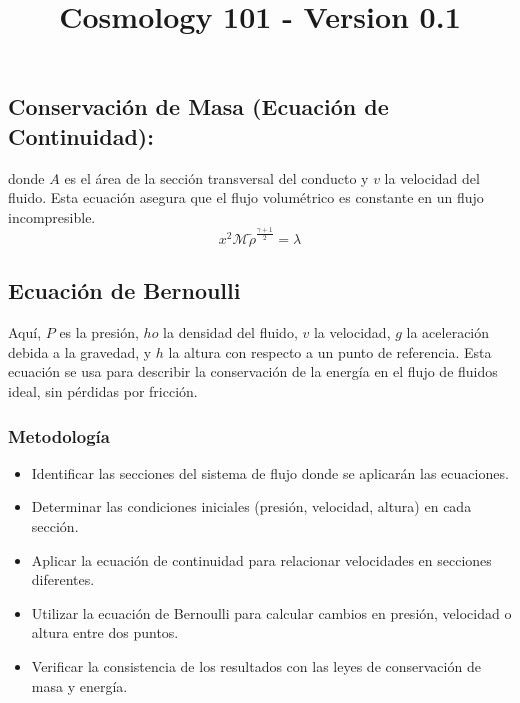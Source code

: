 \documentclass{article}\usepackage{graphicx} \usepackage{amsmath} \usepackage{colortbl}\title{Cosmology 101 - Version 0.1}
\begin{document}
\subsection{Conservación de Masa (Ecuación de Continuidad):}
donde $A$ es el área de la sección transversal del conducto y $v$ la velocidad del fluido. Esta ecuación asegura que el flujo volumétrico es constante en un flujo incompresible.\begin{equation}x^2 \mathcal{M} \tilde{\rho }^{\frac{\gamma +1}{2}}=\lambda\label{ber1}\end{equation}\subsection{Ecuación de Bernoulli}
Aquí, $P$ es la presión, $
ho$ la densidad del fluido, $v$ la velocidad, $g$ la aceleración debida a la gravedad, y $h$ la altura con respecto a un punto de referencia. Esta ecuación se usa para describir la conservación de la energía en el flujo de fluidos ideal, sin pérdidas por fricción.
\subsubsection{Metodología}
\begin{itemize}
\item Identificar las secciones del sistema de flujo donde se aplicarán las ecuaciones.
\item Determinar las condiciones iniciales (presión, velocidad, altura) en cada sección.
\item Aplicar la ecuación de continuidad para relacionar velocidades en secciones diferentes.
\item Utilizar la ecuación de Bernoulli para calcular cambios en presión, velocidad o altura entre dos puntos.
\item Verificar la consistencia de los resultados con las leyes de conservación de masa y energía.
\end{itemize}
\end{document}
